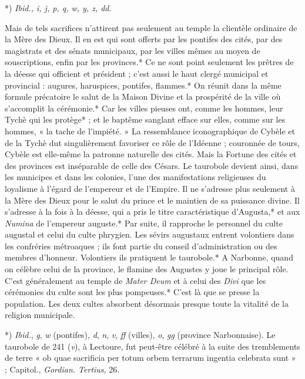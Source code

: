 \documentclass[a4paper, 11pt, oneside, polutonikogreek, french]{article}
\begin{document}
*) \emph{Ibid., i, j, p, q, w, y, z, dd}.

Mais de tels sacrifices n'attirent pas seulement au temple la clientèle ordinaire de la Mère des Dieux. Il en est qui sont offerts par les pontifes des cités, par des magistrats et des sénats municipaux, par les villes mêmes au moyen de souscriptions, enfin par les provinces.* Ce ne sont point seulement les prêtres de la déesse qui officient et président ; c'est aussi le haut clergé municipal et provincial : augures, haruspices, pontifes, flammes.* On réunit dans la même formule précatoire le salut de la Maison Divine et la prospérité de la ville où s'accomplit la cérémonie.* Car les villes pieuses ont, comme les hommes, leur Tychè qui les protège* ; et le baptême sanglant efface sur elles, comme sur les hommes, « la tache de l'impiété. » La ressemblance iconographique de Cybèle et de la Tychè dut singulièrement favoriser ce rôle de l'Idéenne ; couronnée de tours, Cybèle est elle-même la patronne naturelle des cités. Mais la Fortune des cités et des provinces est inséparable de celle des Césars. Le taurobole devient ainsi, dans les municipes et dans les colonies, l'une des manifestations religieuses du loyalisme à l'égard de l'empereur et de l'Empire. Il ne s'adresse plus seulement à la Mère des Dieux pour le salut du prince et le maintien de sa puissance divine. Il s'adresse à la fois à la déesse, qui a pris le titre caractéristique d'Augusta,* et aux \emph{Numina} de l'empereur auguste.* Par suite, il rapproche le personnel du culte augustal et celui du culte phrygien. Les sévirs augustaux entrent volontiers dans les confréries métroaques ; ils font partie du conseil d'administration ou des membres d'honneur. Volontiers ils pratiquent le taurobole.* A Narbonne, quand on célèbre celui de la province, le flamine des Augustes y joue le principal rôle. C'est généralement au temple de \emph{Mater Deum} et à celui des \emph{Divi} que les cérémonies du culte sont les plus pompeuses.* C'est là que se presse la population. Les deux cultes absorbent désormais presque toute la vitalité de la religion municipale.

*) \emph{Ibid.}, \emph{g}, \emph{w} (pontifes), \emph{d}, \emph{n}, \emph{v}, \emph{ff} (villes), \emph{o}, \emph{gg} (province Narbonnaise). Le taurobole de 241 (\emph{v}), à Lectoure, fut peut-être célébré à la suite des tremblements de terre « ob quae sacrificia per totum orbem terrarum ingentia celebrata sunt » ; Capitol., \emph{Gordian. Tertius}, 26.
\end{document}
